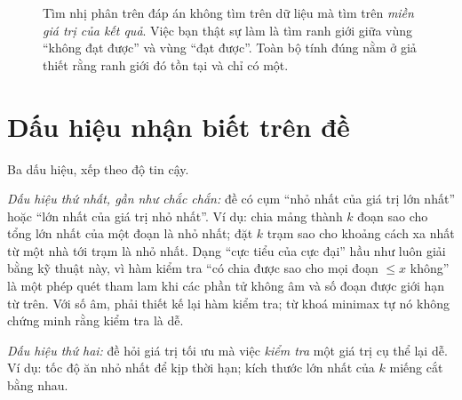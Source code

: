 \documentclass[../../algorithm.tex]{subfiles}
\begin{document}
\begin{figure}[H]\centering
{}
\caption{Tìm nhị phân trên đáp án không tìm trên dữ liệu mà tìm trên \emph{miền giá trị của kết quả}. Việc bạn thật sự làm là tìm ranh giới giữa vùng ``không đạt được'' và vùng ``đạt được''. Toàn bộ tính đúng nằm ở giả thiết rằng ranh giới đó tồn tại và chỉ có một.}
\label{fig:binsearch-answer}
\end{figure}

\section{Dấu hiệu nhận biết trên đề}

Ba dấu hiệu, xếp theo độ tin cậy.

\emph{Dấu hiệu thứ nhất, gần như chắc chắn:} đề có cụm ``nhỏ nhất của giá trị lớn nhất'' hoặc ``lớn nhất của giá trị nhỏ nhất''. Ví dụ: chia mảng thành \(k\) đoạn sao cho tổng lớn nhất của một đoạn là nhỏ nhất; đặt \(k\) trạm sao cho khoảng cách xa nhất từ một nhà tới trạm là nhỏ nhất. Dạng ``cực tiểu của cực đại'' hầu như luôn giải bằng kỹ thuật này, vì hàm kiểm tra ``có chia được sao cho mọi đoạn \(\le x\) không'' là một phép quét tham lam khi các phần tử không âm và số đoạn được giới hạn từ trên. Với số âm, phải thiết kế lại hàm kiểm tra; từ khoá minimax tự nó không chứng minh rằng kiểm tra là dễ.

\emph{Dấu hiệu thứ hai:} đề hỏi giá trị tối ưu mà việc \emph{kiểm tra} một giá trị cụ thể lại dễ. Ví dụ: tốc độ ăn nhỏ nhất để kịp thời hạn; kích thước lớn nhất của \(k\) miếng cắt bằng nhau.
\end{document}
